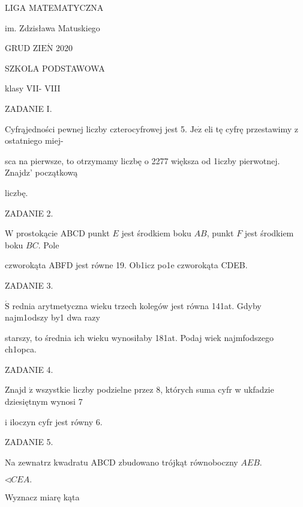 \documentclass[a4paper,12pt]{article}
\begin{document}
LIGA MATEMATYCZNA

im. Zdzisława Matuskiego

GRUD Z$\mathrm{I}\mathrm{E}\acute{\mathrm{N}}$ 2020

SZKOLA PODSTAWOWA

klasy VII- VIII

ZADANIE I.

Cyfrąjedności pewnej liczby czterocyfrowej jest 5. $\mathrm{J}\mathrm{e}\dot{\mathrm{z}}$ eli tę cyfrę przestawimy z ostatniego miej-

sca na pierwsze, to otrzymamy liczbę o 2277 większa od 1iczby pierwotnej. Znajdz' początkową

liczbę.

ZADANIE 2.

$\mathrm{W}$ prostokącie ABCD punkt $E$ jest środkiem boku $AB$, punkt $F$ jest środkiem boku $BC$. Pole

czworokąta ABFD jest równe 19. Ob1icz po1e czworokąta CDEB.

ZADANIE 3.

$\acute{\mathrm{S}}$ rednia arytmetyczna wieku trzech kolegów jest równa 141at. Gdyby najm1odszy by1 dwa razy

starszy, to średnia ich wieku wynosiłaby 181at. Podaj wiek najmfodszego ch1opca.

ZADANIE 4.

Znajd $\acute{\mathrm{z}}$ wszystkie liczby podzielne przez 8, których suma cyfr w ukfadzie dziesiętnym wynosi 7

i iloczyn cyfr jest równy 6.

ZADANIE 5.

Na zewnatrz kwadratu ABCD zbudowano trójkąt równoboczny $AEB.$

$\triangleleft CEA.$

Wyznacz miarę kąta
\end{document}
